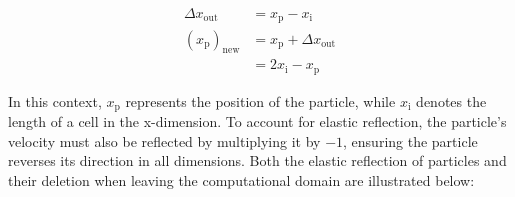 \begin{align}
    \Delta x_{\text{out}} &= x_\mathrm{p} - x_\mathrm{i} \\
    (x_\mathrm{p})_{\text{new}} &= x_\mathrm{p} + \Delta x_{\text{out}} \\
                        &= 2x_\mathrm{i} - x_\mathrm{p}
\end{align}


In this context, $x_\mathrm{p}$ represents the position of the particle, while $x_\mathrm{i}$ denotes the length of a cell in the x-dimension. To account for elastic reflection, the particle's velocity must also be reflected by multiplying it by $-1$, ensuring the particle reverses its direction in all dimensions. Both the elastic reflection of particles and their deletion when leaving the computational domain are illustrated below:

\newcommand{\drawSquareWithDots}{
    \draw[line width = 1] (0,0) -- (3,0) -- (3,3) -- (0,3) -- cycle;
    \def\dashed{.5}
    \draw[dashed] (0,0) -- (0,-\dashed)
    \draw[dashed] (0,0) -- (-\dashed,0)

    \draw[dashed] (3,0) -- (3,-\dashed)
    \draw[dashed] (3,0) -- (3+\dashed,0)

    \draw[dashed] (3,3) -- (3,3+\dashed)
    \draw[dashed] (3,3) -- (3+\dashed,3)

    \draw[dashed] (0,3) -- (0-\dashed,3)
    \draw[dashed] (0,3) -- (0,3+\dashed)
    \fill[jlublau] (0,0) circle (3.5pt);
    \fill[jlublau] (3,0) circle (3.5pt);
    \fill[jlublau] (3,3) circle (3.5pt);
    \fill[jlublau] (0,3) circle (3.5pt);



}

